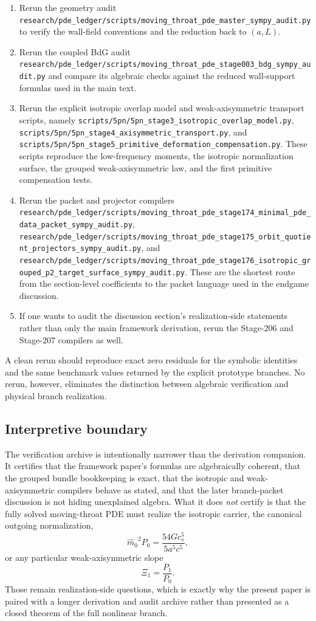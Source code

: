 \documentclass[11pt]{article}
\theoremstyle{definition}
\newcommand{\mhat}{\ensuremath{\hat m_0}}
\newcommand{\XiOne}{\ensuremath{\Xi_1}}
\begin{document}
\begin{enumerate}
    \item Rerun the geometry audit \nolinkurl{research/pde_ledger/scripts/moving_throat_pde_master_sympy_audit.py} to verify the wall-field conventions and the reduction back to $(a,L)$.
    \item Rerun the coupled BdG audit \nolinkurl{research/pde_ledger/scripts/moving_throat_pde_stage003_bdg_sympy_audit.py} and compare its algebraic checks against the reduced wall-support formulas used in the main text.
    \item Rerun the explicit isotropic overlap model and weak-axisymmetric transport scripts, namely \nolinkurl{scripts/5pn/5pn_stage3_isotropic_overlap_model.py}, \nolinkurl{scripts/5pn/5pn_stage4_axisymmetric_transport.py}, and \nolinkurl{scripts/5pn/5pn_stage5_primitive_deformation_compensation.py}. These scripts reproduce the low-frequency moments, the isotropic normalization surface, the grouped weak-axisymmetric law, and the first primitive compensation tests.
    \item Rerun the packet and projector compilers \nolinkurl{research/pde_ledger/scripts/moving_throat_pde_stage174_minimal_pde_data_packet_sympy_audit.py}, \nolinkurl{research/pde_ledger/scripts/moving_throat_pde_stage175_orbit_quotient_projectors_sympy_audit.py}, and \nolinkurl{research/pde_ledger/scripts/moving_throat_pde_stage176_isotropic_grouped_p2_target_surface_sympy_audit.py}. These are the shortest route from the section-level coefficients to the packet language used in the endgame discussion.
    \item If one wants to audit the discussion section's realization-side statements rather than only the main framework derivation, rerun the Stage-206 and Stage-207 compilers as well.
\end{enumerate}

A clean rerun should reproduce exact zero residuals for the symbolic identities and the same benchmark values returned by the explicit prototype branches. No rerun, however, eliminates the distinction between algebraic verification and physical branch realization.

\subsection{Interpretive boundary}

The verification archive is intentionally narrower than the derivation companion. It certifies that the framework paper's formulas are algebraically coherent, that the grouped bundle bookkeeping is exact, that the isotropic and weak-axisymmetric compilers behave as stated, and that the later branch-packet discussion is not hiding unexplained algebra. What it does \emph{not} certify is that the fully solved moving-throat PDE must realize the isotropic carrier, the canonical outgoing normalization,
\[
 \mhat^{2}P_0=\frac{54Gc_s^5}{5a^5c^5},
\]
or any particular weak-axisymmetric slope
\[
 \XiOne=\frac{P_1}{P_0}.
\]
Those remain realization-side questions, which is exactly why the present paper is paired with a longer derivation and audit archive rather than presented as a closed theorem of the full nonlinear branch.
\end{document}
